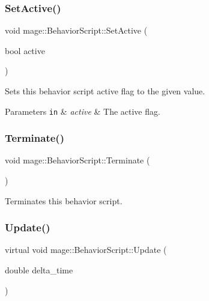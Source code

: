 \subsubsection{\texorpdfstring{Set\+Active()}{SetActive()}}
{\footnotesize\ttfamily void mage\+::\+Behavior\+Script\+::\+Set\+Active (\begin{DoxyParamCaption}\item[{bool}]{active }\end{DoxyParamCaption})\hspace{0.3cm}{\ttfamily [noexcept]}}

Sets this behavior script active flag to the given value.


\begin{DoxyParams}[1]{Parameters}
\mbox{\tt in}  & {\em active} & The active flag. \\
\hline
\end{DoxyParams}
\hypertarget{classmage_1_1_behavior_script_a2beae460bb84a135aa7e29c7baf6b25b}{}\label{classmage_1_1_behavior_script_a2beae460bb84a135aa7e29c7baf6b25b} 
\subsubsection{\texorpdfstring{Terminate()}{Terminate()}}
{\footnotesize\ttfamily void mage\+::\+Behavior\+Script\+::\+Terminate (\begin{DoxyParamCaption}{ }\end{DoxyParamCaption})\hspace{0.3cm}{\ttfamily [noexcept]}}

Terminates this behavior script. \hypertarget{classmage_1_1_behavior_script_a905b6c83640cb91d19fecab3435f6feb}{}\label{classmage_1_1_behavior_script_a905b6c83640cb91d19fecab3435f6feb} 
\subsubsection{\texorpdfstring{Update()}{Update()}}
{\footnotesize\ttfamily virtual void mage\+::\+Behavior\+Script\+::\+Update (\begin{DoxyParamCaption}\item[{double}]{delta\+\_\+time }\end{DoxyParamCaption})\hspace{0.3cm}{\ttfamily [pure virtual]}}


